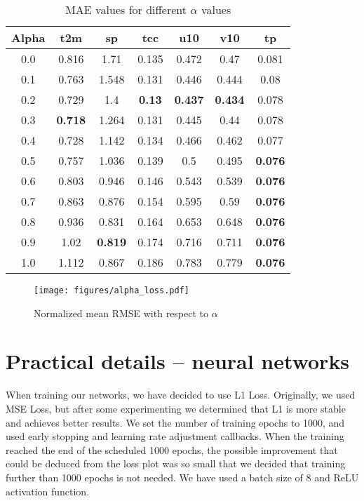 \begin{table}[htbp]
    \centering
    \begin{tabular}{ccccccc}
        \toprule
        Alpha & t2m & sp & tcc & u10 & v10 & tp \\
        \midrule
        0.0 & 0.816 & 1.71 & 0.135 & 0.472 & 0.47 & 0.081 \\
        0.1 & 0.763 & 1.548 & 0.131 & 0.446 & 0.444 & 0.08 \\
        0.2 & 0.729 & 1.4 & \textbf{0.13} & \textbf{0.437} & \textbf{0.434} & 0.078 \\
        0.3 & \textbf{0.718} & 1.264 & 0.131 & 0.445 & 0.44 & 0.078 \\
        0.4 & 0.728 & 1.142 & 0.134 & 0.466 & 0.462 & 0.077 \\
        0.5 & 0.757 & 1.036 & 0.139 & 0.5 & 0.495 & \textbf{0.076} \\
        0.6 & 0.803 & 0.946 & 0.146 & 0.543 & 0.539 & \textbf{0.076} \\
        0.7 & 0.863 & 0.876 & 0.154 & 0.595 & 0.59 & \textbf{0.076} \\
        0.8 & 0.936 & 0.831 & 0.164 & 0.653 & 0.648 & \textbf{0.076} \\
        0.9 & 1.02 & \textbf{0.819} & 0.174 & 0.716 & 0.711 & \textbf{0.076} \\
        1.0 & 1.112 & 0.867 & 0.186 & 0.783 & 0.779 & \textbf{0.076} \\
        \bottomrule
    \end{tabular}
    \caption{MAE values for different $\alpha$ values}
    \label{tab:mae_alpha}
\end{table}

\begin{figure}[!ht]
    \centering
    \texttt{[image: figures/alpha\_loss.pdf]}
    \caption{Normalized mean RMSE with respect to $\alpha$}
    \label{fig:alpha-plot}
\end{figure}

\section{Practical details -- neural networks}
When training our networks, we have decided to use L1 Loss. Originally, we used MSE Loss, but after some experimenting we determined that L1 is more stable and achieves better results. We set the number of training epochs to 1000, and used early stopping and learning rate adjustment callbacks. When the training reached the end of the scheduled 1000 epochs, the possible improvement that could be deduced from the loss plot was so small that we decided that training further than 1000 epochs is not needed. We have used a batch size of 8 and ReLU activation function.

